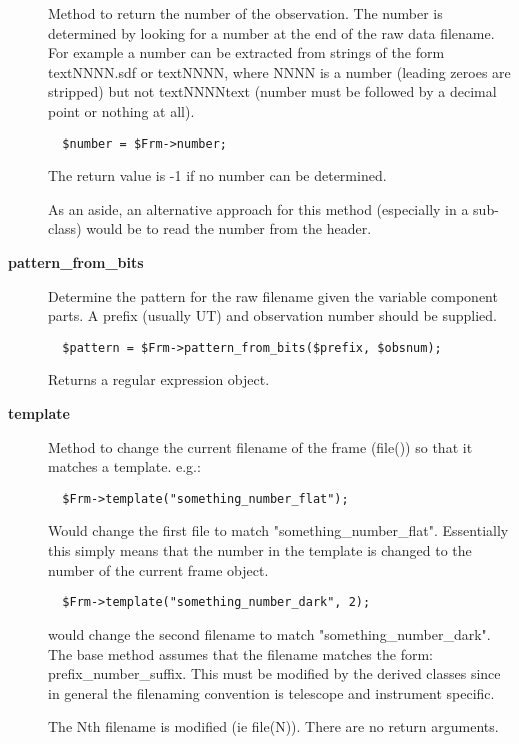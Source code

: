 \begin{description}
Method to return the number of the observation. The number is
determined by looking for a number at the end of the raw data
filename.  For example a number can be extracted from strings of the
form textNNNN.sdf or textNNNN, where NNNN is a number (leading zeroes
are stripped) but not textNNNNtext (number must be followed by a decimal
point or nothing at all).

\begin{verbatim}
  $number = $Frm->number;
\end{verbatim}


The return value is -1 if no number can be determined.



As an aside, an alternative approach for this method (especially
in a sub-class) would be to read the number from the header.


\item[{\textbf{pattern\_from\_bits}}] \mbox{}

Determine the pattern for the raw filename given the variable component
parts. A prefix (usually UT) and observation number should
be supplied.

\begin{verbatim}
  $pattern = $Frm->pattern_from_bits($prefix, $obsnum);
\end{verbatim}


Returns a regular expression object.


\item[{\textbf{template}}] \mbox{}

Method to change the current filename of the frame (file())
so that it matches a template. e.g.:

\begin{verbatim}
  $Frm->template("something_number_flat");
\end{verbatim}


Would change the first file to match "something\_number\_flat".
Essentially this simply means that the number in the template
is changed to the number of the current frame object.

\begin{verbatim}
  $Frm->template("something_number_dark", 2);
\end{verbatim}


would change the second filename to match "something\_number\_dark".
The base method assumes that the filename matches the form:
prefix\_number\_suffix. This must be modified by the derived
classes since in general the filenaming convention is telescope
and instrument specific.



The Nth filename is modified (ie file(N)).
There are no return arguments.

\end{description}
